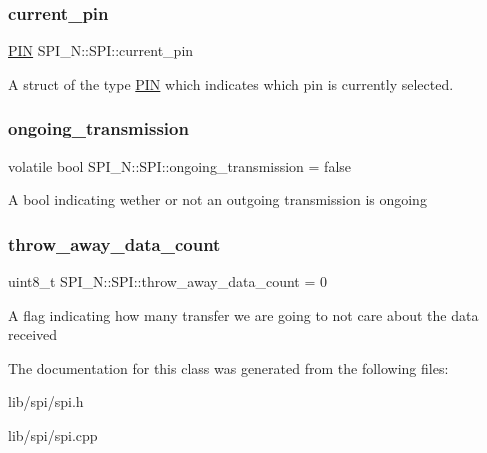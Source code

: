 \subsubsection{\texorpdfstring{current\+\_\+pin}{current\_pin}}
{\footnotesize\ttfamily \hyperlink{struct_s_p_i___n_1_1_p_i_n}{P\+IN} S\+P\+I\+\_\+\+N\+::\+S\+P\+I\+::current\+\_\+pin}

A struct of the type \hyperlink{struct_s_p_i___n_1_1_p_i_n}{P\+IN} which indicates which pin is currently selected. \hypertarget{class_s_p_i___n_1_1_s_p_i_a89115bf64f31cd26d0b6ed3292decabb}{}\label{class_s_p_i___n_1_1_s_p_i_a89115bf64f31cd26d0b6ed3292decabb} 
\subsubsection{\texorpdfstring{ongoing\+\_\+transmission}{ongoing\_transmission}}
{\footnotesize\ttfamily volatile bool S\+P\+I\+\_\+\+N\+::\+S\+P\+I\+::ongoing\+\_\+transmission = false\hspace{0.3cm}{\ttfamily [private]}}

A bool indicating wether or not an outgoing transmission is ongoing \hypertarget{class_s_p_i___n_1_1_s_p_i_aaed8cc6f36275c3e33fcada1b9172742}{}\label{class_s_p_i___n_1_1_s_p_i_aaed8cc6f36275c3e33fcada1b9172742} 
\subsubsection{\texorpdfstring{throw\+\_\+away\+\_\+data\+\_\+count}{throw\_away\_data\_count}}
{\footnotesize\ttfamily uint8\+\_\+t S\+P\+I\+\_\+\+N\+::\+S\+P\+I\+::throw\+\_\+away\+\_\+data\+\_\+count = 0\hspace{0.3cm}{\ttfamily [private]}}

A flag indicating how many transfer we are going to not care about the data received 

The documentation for this class was generated from the following files\+:\begin{DoxyCompactItemize}
\item 
lib/spi/spi.\+h\item 
lib/spi/spi.\+cpp\end{DoxyCompactItemize}
